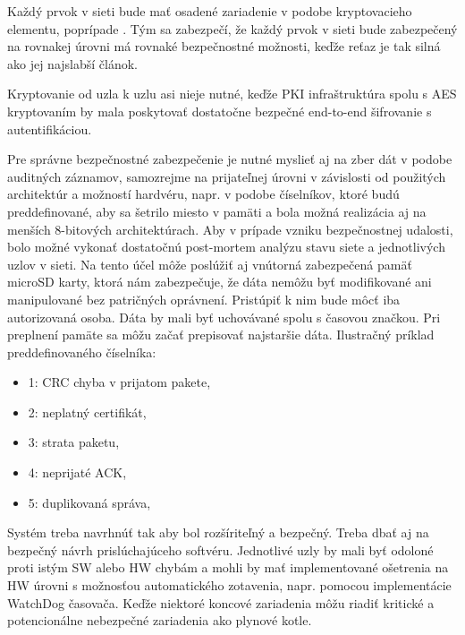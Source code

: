 \documentclass[12pt,a4wide,oneside,openright]{report}
\begin{document}
Každý prvok v sieti bude mať osadené zariadenie v podobe kryptovacieho elementu, poprípade . Tým sa zabezpečí, že každý prvok v sieti bude zabezpečený na rovnakej úrovni má rovnaké bezpečnostné možnosti, keďže reťaz je tak silná ako jej najslabší článok.

Kryptovanie od uzla k uzlu asi nieje nutné, keďže PKI infraštruktúra spolu s AES kryptovaním by mala poskytovať dostatočne bezpečné end-to-end šifrovanie s autentifikáciou.

Pre správne bezpečnostné zabezpečenie je nutné myslieť aj na zber dát v podobe auditných záznamov, samozrejme na prijateľnej úrovni v závislosti od použitých architektúr a možností hardvéru, napr. v podobe číselníkov, ktoré budú preddefinované, aby sa šetrilo miesto v pamäti a bola možná realizácia aj na menších 8-bitových architektúrach. Aby v prípade vzniku bezpečnostnej udalosti, bolo možné vykonať dostatočnú post-mortem analýzu stavu siete a jednotlivých uzlov v sieti. Na tento účel môže poslúžiť aj vnútorná zabezpečená pamäť microSD karty, ktorá nám zabezpečuje, že dáta nemôžu byť  modifikované ani manipulované bez patričných oprávnení. Pristúpiť k nim bude môcť iba autorizovaná osoba. Dáta by mali byť uchovávané spolu s časovou značkou. Pri preplnení pamäte sa môžu začať prepisovať najstaršie dáta.
Ilustračný príklad preddefinovaného číselníka:
\begin{itemize}
	\item 1: CRC chyba v prijatom pakete,
	\item 2: neplatný certifikát,
	\item 3: strata paketu, 
	\item 4: neprijaté ACK,
	\item 5: duplikovaná správa,
\end{itemize}
\onehalfspacing

Systém treba navrhnúť tak aby bol rozšíriteľný a bezpečný. Treba dbať aj na bezpečný návrh prislúchajúceho softvéru.
Jednotlivé uzly by mali byť odoloné proti istým SW alebo HW chybám a mohli by mať implementované ošetrenia na HW úrovni s možnosťou automatického zotavenia, napr. pomocou implementácie WatchDog časovača. Keďže niektoré koncové zariadenia môžu riadiť kritické a potencionálne nebezpečné zariadenia ako plynové kotle.
\end{document}
